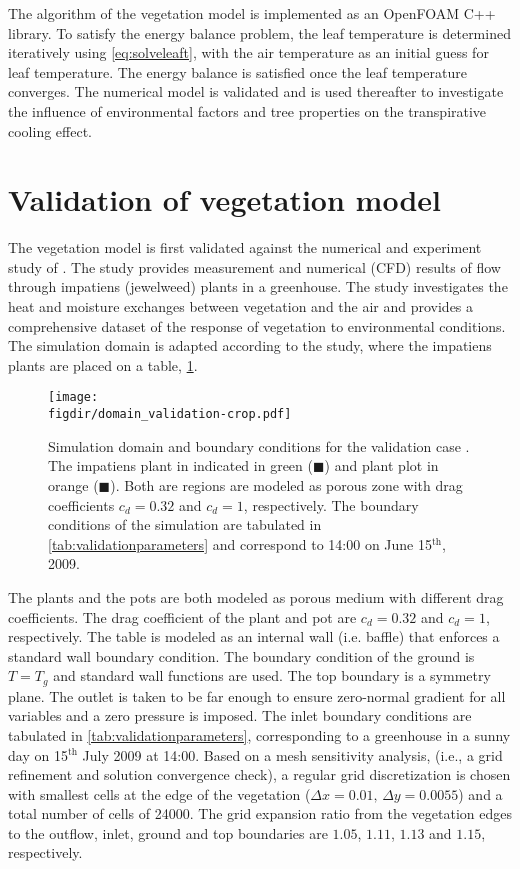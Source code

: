 The algorithm of the vegetation model is implemented as an OpenFOAM C++ library. To satisfy the energy balance problem, the leaf temperature is determined iteratively using \cref{eq:solveleaft}, with the air temperature as an initial guess for leaf temperature. The energy balance is satisfied once the leaf temperature converges. The numerical model is validated and is used thereafter to investigate the influence of environmental factors and tree properties on the transpirative cooling effect.

\section{Validation of vegetation model}

The vegetation model is first validated against the numerical and experiment study of \cite{Kichah2012}. The study provides measurement and numerical (CFD) results of flow through impatiens (jewelweed) plants in a greenhouse. The study investigates the heat and moisture exchanges between vegetation and the air and provides a comprehensive dataset of the response of vegetation to environmental conditions. The simulation domain is adapted according to the study, where the impatiens plants are placed on a table, \cref{fig:domain_validation}.

	\begin{figure}[h]
		\centering
		\texttt{[image: \\figdir/domain\_validation-crop.pdf]}
		\caption{Simulation domain and boundary conditions for the validation case \cite{Kichah2012}. The impatiens plant in indicated in green ({\color{flatuidarkgreen}$\blacksquare$}) and plant plot in orange ({\color{flatuiorange}$\blacksquare$}). Both are regions are modeled as porous zone with drag coefficients $c_d=0.32$ and $c_d=1$, respectively. The boundary conditions of the simulation are tabulated in \cref{tab:validationparameters} and correspond to 14:00 on June 15$^{\mathrm{th}}$, 2009.}
		\label{fig:domain_validation}
	\end{figure}

The plants and the pots are both modeled as porous medium with different drag coefficients. The drag coefficient of the plant and pot are $c_d=0.32$ and $c_d=1$, respectively. The table is modeled as an internal wall (i.e. baffle) that enforces a standard wall boundary condition. The boundary condition of the ground is $T=T_g$ and standard wall functions are used. The top boundary is a symmetry plane. The outlet is taken to be far enough to ensure zero-normal gradient for all variables and a zero pressure is imposed. The inlet boundary conditions are tabulated in \cref{tab:validationparameters}, corresponding to a greenhouse in a sunny day on 15$^{\mathrm{th}}$ July 2009 at 14:00. Based on a mesh sensitivity analysis, (i.e., a grid refinement and solution convergence check), a regular grid discretization is chosen with smallest cells at the edge of the vegetation ($\Delta x=0.01,\,\Delta y=\num{0.0055}$) and a total number of cells of \num{24000}. The grid expansion ratio from the vegetation edges to the outflow, inlet, ground and top boundaries are $1.05$, $1.11$, $1.13$ and $1.15$, respectively. 

